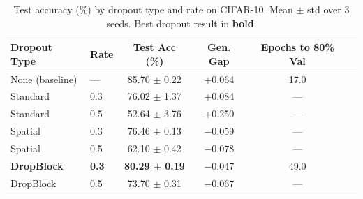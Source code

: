 \begin{table}[t]
\centering
\caption{Test accuracy (\%) by dropout type and rate on CIFAR-10. Mean $\pm$ std over 3 seeds. Best dropout result in \textbf{bold}.}
\label{tab:comparison}
\begin{tabular}{llcccc}
\toprule
Dropout Type & Rate & Test Acc (\%) & Gen. Gap & Epochs to 80\% Val \\
\midrule
None (baseline) & --- & 85.70 $\pm$ 0.22 & +0.064 & 17.0 \\
\midrule
Standard & 0.3 & 76.02 $\pm$ 1.37 & +0.084 & --- \\
Standard & 0.5 & 52.64 $\pm$ 3.76 & +0.250 & --- \\
\midrule
Spatial & 0.3 & 76.46 $\pm$ 0.13 & $-$0.059 & --- \\
Spatial & 0.5 & 62.10 $\pm$ 0.42 & $-$0.078 & --- \\
\midrule
\textbf{DropBlock} & \textbf{0.3} & \textbf{80.29 $\pm$ 0.19} & $-$0.047 & 49.0 \\
DropBlock & 0.5 & 73.70 $\pm$ 0.31 & $-$0.067 & --- \\
\bottomrule
\end{tabular}
\end{table}
